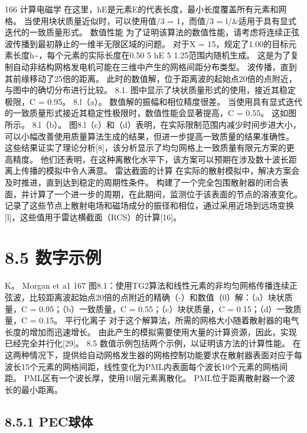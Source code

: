\documentclass[UTF8,11pt,a4paper,openany,fontset=fandol]{ctexbook}
\begin{document}
166 计算电磁学 在这里，hE是元素E的代表长度，最小长度覆盖所有元素和网格。 当使用块状质量近似时，可以使用值/3 = 1，而值/3 = l/\&适用于具有显式迭代的一致质量形式。 数值性能 为了证明该算法的数值性能，请考虑将连续正弦波传播到最初静止的一维半无限区域的问题。 对于X = 15，规定了1.00的目标元素长度h\textasciitilde{}，每个元素的实际长度在0.50 5 hE 5 1.25范围内随机生成。 这是为了复制自动非结构网格发电机可能在三维中产生的网格间距分布类型。 波传播，直到其前缘移动了25倍的距离。 此时的数值解，位于距离波的起始点20倍的点附近，与图中的确切分布进行比较。 8.1. 图中显示了块状质量形式的使用，接近其稳定极限，C = 0.95。 8.l（a）。 数值解的振幅和相位精度很差。 当使用具有显式迭代的一致质量形式接近其稳定性极限时，数值性能会显著提高，C = 0.55。 这如图所示。 8.l（b）。 图8.l（c）和（d）表明，在实际限制范围内减少时间步进大小，可以小幅改善使用质量算法生成的结果，但进一步提高一致质量的结果准确性。 这些结果证实了理论分析[8]，该分析显示了均匀网格上一致质量有限元方案的更高精度。 他们还表明，在这种离散化水平下，该方案可以预期在涉及数十波长距离上传播的模拟中令人满意。 雷达截面的计算 在实际的散射模拟中，解决方案会及时推进，直到达到稳定的周期性条件。 构建了一个完全包围散射器的闭合表面，并计算了一个进一步的周期，在此期间，监测位于该表面的节点的溶液变化。 记录了这些节点上散射电场和磁场成分的振径和相位，通过采用近场到远场变换[l]，这些值用于雷达横截面（RCS）的计算[16]。

\section{8.5 数字示例}
K。 Morgan et a1 167 图8.1：使用TG2算法和线性元素的非均匀网格传播连续正弦波，比较距离波起始点20倍的点附近的精确（-）和数值（0）解：（a）块状质量，C = 0.95；（b）一致质量，C = 0.55；（c）块状质量，C = 0.15；（d）一致质量，C = 0.15。 平行化离子 对于这个解算法，所需的网格大小随着散射器的电气长度的增加而迅速增长。 由此产生的模拟需要使用大量的计算资源，因此，实现已经完全并行化[29]。 8.5 数值示例包括两个示例，以证明该方法的计算性能。 在这两种情况下，提供给自动网格发生器的网格控制功能要求在散射器表面对应于每波长15个元素的网格间距，线性变化为PML内表面每个波长10个元素的网格间距。 PML区有一个波长厚，使用10层元素离散化。 PML位于距离散射器一个波长的最小距离。

\subsection{8.5.1 PEC球体}
\end{document}
